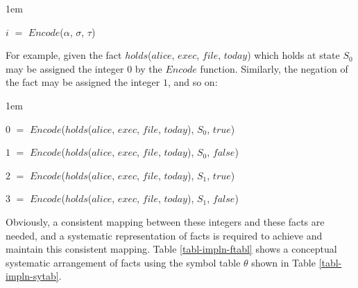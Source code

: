 \documentclass[11pt]{report}
\newenvironment{vquote}
{
  \begin{list}{}{\leftmargin 1em}\item[]
}
{
  \end{list}
}
\begin{document}
        \begin{vquote}
          $i$ $=$ $Encode$($\alpha$, $\sigma$, $\tau$)
        \end{vquote}

        For example, given the fact $holds$($alice$, $exec$, $file$,
        $today$) which holds at state $S_0$ may be assigned the integer
        $0$ by the $Encode$ function. Similarly, the negation of the fact
        may be assigned the integer $1$, and so on:

        \begin{vquote}
          $0$ $=$ $Encode$($holds$($alice$, $exec$, $file$, $today$), $S_0$, $true$)

          $1$ $=$ $Encode$($holds$($alice$, $exec$, $file$, $today$), $S_0$, $false$)

          $2$ $=$ $Encode$($holds$($alice$, $exec$, $file$, $today$), $S_1$, $true$)

          $3$ $=$ $Encode$($holds$($alice$, $exec$, $file$, $today$), $S_1$, $false$)
        \end{vquote}

        Obviously, a consistent mapping between these integers and these
        facts are needed, and a systematic representation of facts is
        required to achieve and maintain this consistent mapping. Table
        \ref{tabl-impln-ftabl} shows a conceptual systematic arrangement of
        facts using the symbol table $\theta$ shown in Table
        \ref{tabl-impln-sytab}.
\end{document}
